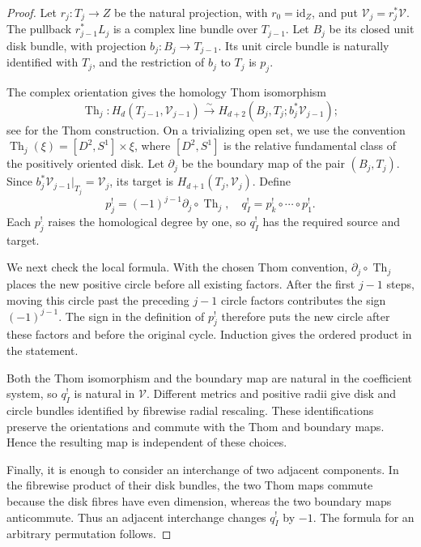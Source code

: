 \documentclass[12pt]{amsart}
\numberwithin{equation}{section}
\theoremstyle{plain}
\theoremstyle{definition}
\theoremstyle{remark}
\theoremstyle{definition}
\begin{document}
\begin{proof}
Let $r_j:T_j\to Z$ be the natural projection, with $r_0=\mathrm{id}_Z$, and put $\mathcal V_j=r_j^*\mathcal V$. The pullback $r_{j-1}^*L_j$ is a complex line bundle over $T_{j-1}$. Let $B_j$ be its closed unit disk bundle, with projection $b_j:B_j\to T_{j-1}$. Its unit circle bundle is naturally identified with $T_j$, and the restriction of $b_j$ to $T_j$ is $p_j$.

The complex orientation gives the homology Thom isomorphism
\[
\operatorname{Th}_j:
H_d(T_{j-1},\mathcal V_{j-1})
\xrightarrow{\sim}
H_{d+2}(B_j,T_j;b_j^*\mathcal V_{j-1});
\]
see \cite[Chapter~VI, Section~11]{Bredon1993} for the Thom construction. On a trivializing open set, we use the convention $\operatorname{Th}_j(\xi)=[D^2,S^1]\times\xi$, where $[D^2,S^1]$ is the relative fundamental class of the positively oriented disk. Let $\partial_j$ be the boundary map of the pair $(B_j,T_j)$. Since $b_j^*\mathcal V_{j-1}|_{T_j}=\mathcal V_j$, its target is $H_{d+1}(T_j,\mathcal V_j)$. Define
\[
p_j^!=(-1)^{j-1}\partial_j\circ\operatorname{Th}_j,
\quad
q_I^!=p_k^!\circ\cdots\circ p_1^!.
\]
Each $p_j^!$ raises the homological degree by one, so $q_I^!$ has the required source and target.

We next check the local formula. With the chosen Thom convention, $\partial_j\circ\operatorname{Th}_j$ places the new positive circle before all existing factors. After the first $j-1$ steps, moving this circle past the preceding $j-1$ circle factors contributes the sign $(-1)^{j-1}$. The sign in the definition of $p_j^!$ therefore puts the new circle after these factors and before the original cycle. Induction gives the ordered product in the statement.

Both the Thom isomorphism and the boundary map are natural in the coefficient system, so $q_I^!$ is natural in $\mathcal V$. Different metrics and positive radii give disk and circle bundles identified by fibrewise radial rescaling. These identifications preserve the orientations and commute with the Thom and boundary maps. Hence the resulting map is independent of these choices.

Finally, it is enough to consider an interchange of two adjacent components. In the fibrewise product of their disk bundles, the two Thom maps commute because the disk fibres have even dimension, whereas the two boundary maps anticommute. Thus an adjacent interchange changes $q_I^!$ by $-1$. The formula for an arbitrary permutation follows.
\end{proof}
\end{document}
